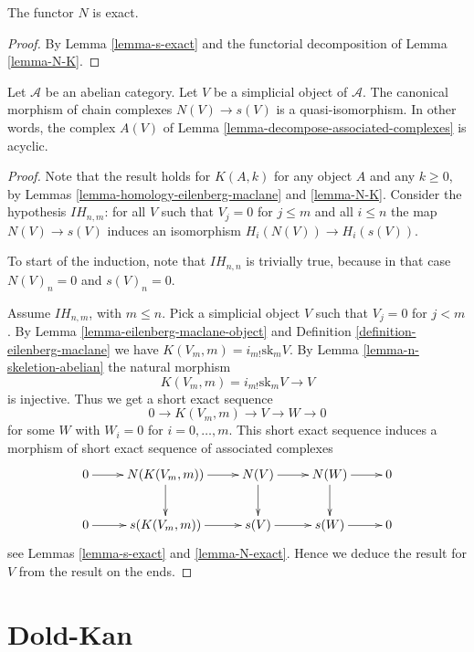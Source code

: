 \begin{lemma}
\label{lemma-N-exact}
The functor $N$ is exact.
\end{lemma}

\begin{proof}
By Lemma \ref{lemma-s-exact} and the functorial
decomposition of Lemma \ref{lemma-N-K}.
\end{proof}

\begin{lemma}
\label{lemma-quasi-isomorphism}
Let $\mathcal{A}$ be an abelian category.
Let $V$ be a simplicial object of $\mathcal{A}$.
The canonical morphism of chain complexes
$N(V) \to s(V)$ is a quasi-isomorphism.
In other words, the complex $A(V)$ of Lemma
\ref{lemma-decompose-associated-complexes} is acyclic.
\end{lemma}

\begin{proof}
Note that the result holds for $K(A, k)$ for
any object $A$ and any $k \geq 0$, by Lemmas
\ref{lemma-homology-eilenberg-maclane} and \ref{lemma-N-K}.
Consider the hypothesis $IH_{n, m}$:
for all $V$ such that $V_j = 0$ for
$j \leq m$ and all $i \leq n$ the map
$N(V) \to s(V)$ induces an isomorphism
$H_i(N(V)) \to H_i(s(V))$.

\medskip\noindent
To start of the induction, note that $IH_{n, n}$
is trivially true, because in that case $N(V)_n = 0$
and $s(V)_n = 0$.

\medskip\noindent
Assume $IH_{n, m}$, with $m \leq n$.
Pick a simplicial object $V$ such that
$V_j = 0$ for $j < m$. By Lemma \ref{lemma-eilenberg-maclane-object}
and Definition \ref{definition-eilenberg-maclane}
we have $K(V_m, m) = i_{m!} \text{sk}_mV$.
By Lemma \ref{lemma-n-skeletion-abelian} the natural morphism
$$
K(V_m, m) = i_{m!} \text{sk}_mV \to V
$$
is injective. Thus we get a short exact sequence
$$
0 \to K(V_m, m) \to V \to W \to 0
$$
for some $W$ with $W_i = 0$ for $i = 0, \ldots, m$. This short exact sequence
induces a morphism of short exact sequence of associated complexes
$$
\xymatrix{
0 \ar[r] &
N(K(V_m, m)) \ar[r] \ar[d] &
N(V) \ar[r] \ar[d] &
N(W) \ar[r] \ar[d] &
0 \\
0 \ar[r] &
s(K(V_m, m)) \ar[r] &
s(V) \ar[r] &
s(W) \ar[r] &
0
}
$$
see Lemmas \ref{lemma-s-exact} and \ref{lemma-N-exact}.
Hence we deduce the result for $V$ from the result
on the ends.
\end{proof}


\section{Dold-Kan}
\label{section-dold-kan}

